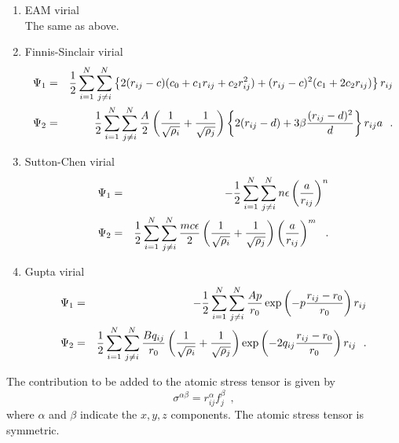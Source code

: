\begin{enumerate}
\item EAM virial \\
The same as above.
\item Finnis-Sinclair virial
\begin{eqnarray}
\Psi_{1} &=& {1 \over 2} \sum_{i=1}^{N} \sum_{j \ne i}^{N}
\left\{ 2 (r_{ij}-c) (c_{0}+c_{1}r_{ij}+c_{2}r_{ij}^{2}) +
(r_{ij}-c)^{2} (c_{1}+2c_{2}r_{ij}) \right\} r_{ij} \nonumber \\
\Psi_{2} &=& {1 \over 2} \sum_{i=1}^{N} \sum_{j \ne i}^{N}
{A \over 2} \left( \frac{1}{\sqrt{\rho_{i}}} + \frac{1}{\sqrt{\rho_{j}}} \right) 
\left\{ 2(r_{ij}-d) + 3 \beta \frac{(r_{ij}-d)^{2}}{d} \right\} r_{ij}a~~.
\end{eqnarray}
\item Sutton-Chen virial
\begin{eqnarray}
\Psi_{1} &=& -{1 \over 2} \sum_{i=1}^{N} \sum_{j \ne i}^{N} n \epsilon \left( \frac{a}{r_{ij}} \right)^{n} \nonumber \\
\Psi_{2} &=& {1 \over 2} \sum_{i=1}^{N} \sum_{j \ne i}^{N} \frac{m c
  \epsilon}{2} 
\left( \frac{1}{\sqrt{\rho_{i}}} + \frac{1}{\sqrt{\rho_{j}}} \right) 
\left( \frac{a}{r_{ij}} \right)^{m}~~.
\end{eqnarray}
\item Gupta virial
\begin{eqnarray}
\Psi_{1} &=& -{1 \over 2} \sum_{i=1}^{N} \sum_{j \ne i}^{N}
\frac{A p}{r_{0}} \exp \left( -p \frac{r_{ij}-r_{0}}{r_{0}} \right) r_{ij} \nonumber \\
\Psi_{2} &=& {1 \over 2} \sum_{i=1}^{N} \sum_{j \ne i}^{N} \frac{B q_{ij}}{r_{0}}
\left( \frac{1}{\sqrt{\rho_{i}}} + \frac{1}{\sqrt{\rho_{j}}} \right) 
\exp \left( -2 q_{ij} \frac{r_{ij}-r_{0}}{r_{0}} \right) r_{ij}~~.
\end{eqnarray}
\end{enumerate}

The contribution to be added to the atomic stress tensor is
given by
\begin{equation}
\sigma^{\alpha \beta} = r_{ij}^{\alpha} f_{j}^{\beta}~~,
\end{equation}
where $\alpha$ and $\beta$ indicate the $x,y,z$ components.  The
atomic stress tensor is symmetric.

